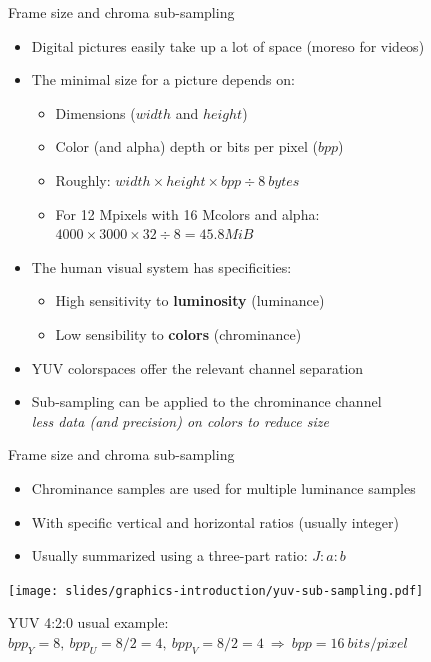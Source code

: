 \begin{frame}{Frame size and chroma sub-sampling}
  \begin{itemize}
  \item Digital pictures easily take up a lot of space (moreso for videos)
  \item The minimal size for a picture depends on:
    \begin{itemize}
    \item Dimensions (\(width\) and \(height\))
    \item Color (and alpha) depth or bits per pixel (\(bpp\))
    \item Roughly: \(width \times height \times bpp \div 8~bytes\)
    \item For 12 Mpixels with 16 Mcolors and alpha: \(4000 \times 3000 \times 32 \div 8 = 45.8 MiB\)
    \end{itemize}
  \item The human visual system has specificities:
    \begin{itemize}
    \item High sensitivity to \textbf{luminosity} (luminance)
    \item Low sensibility to \textbf{colors} (chrominance)
    \end{itemize}
  \item YUV colorspaces offer the relevant channel separation
  \item Sub-sampling can be applied to the chrominance channel\\
  \textit{less data (and precision) on colors to reduce size}
  \end{itemize}
\end{frame}

\begin{frame}{Frame size and chroma sub-sampling}
  \begin{itemize}
  \item Chrominance samples are used for multiple luminance samples
  \item With specific vertical and horizontal ratios (usually integer)
  \item Usually summarized using a three-part ratio: \(J:a:b\)
  \end{itemize}

  \begin{center}
  \texttt{[image: slides/graphics-introduction/yuv-sub-sampling.pdf]}

  YUV 4:2:0 usual example:\\
  {\small\(bpp_Y = 8,~bpp_U = 8 / 2 = 4,~bpp_V = 8 / 2 = 4 ~\Rightarrow~ bpp = 16~bits/pixel\)}
  \end{center}
\end{frame}

